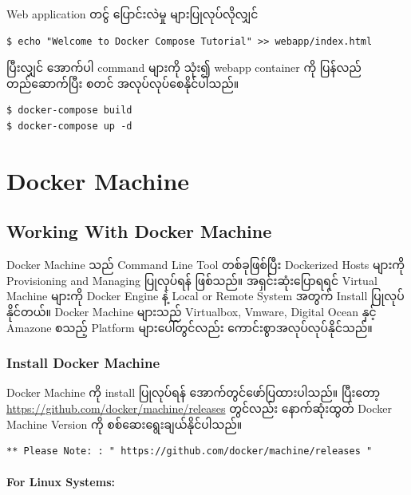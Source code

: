 \documentclass[]{article}
\let\oldparagraph\paragraph
\renewcommand{\paragraph}[1]{\oldparagraph{#1}\mbox{}}
\begin{document}
Web application တင်ွ ပြောင်းလဲမှု များပြုလုပ်လိုလျှင်

\begin{verbatim}
$ echo "Welcome to Docker Compose Tutorial" >> webapp/index.html
\end{verbatim}

ပြီးလျှင် အောက်ပါ command များကို သုံး၍ webapp container ကို ပြန်လည်
တည်ဆောက်ပြီး စတင် အလုပ်လုပ်စေနိုင်ပါသည်။

\begin{verbatim}
$ docker-compose build
$ docker-compose up -d
\end{verbatim}

\pagebreak

\hypertarget{docker-machine}{%
\section{Docker Machine}\label{docker-machine}}

\hypertarget{working-with-docker-machine}{%
\subsection{Working With Docker
Machine}\label{working-with-docker-machine}}

Docker Machine သည် Command Line Tool တစ်ခုဖြစ်ပြီး Dockerized Hosts
များကို Provisioning and Managing ပြုလုပ်ရန် ဖြစ်သည်။ အရှင်းဆုံးပြောရရင်
Virtual Machine များကို Docker Engine နဲ့ Local or Remote System အတွက်
Install ပြုလုပ်နိုင်တယ်။ Docker Machine များသည် Virtualbox, Vmware,
Digital Ocean နှင့် Amazone စသည့် Platform များပေါ်တွင်လည်း
ကောင်းစွာအလုပ်လုပ်နိုင်သည်။

\hypertarget{install-docker-machine}{%
\subsubsection{Install Docker Machine}\label{install-docker-machine}}

Docker Machine ကို install ပြုလုပ်ရန် အောက်တွင်ဖော်ပြထားပါသည်။ ပြီးတော့
\url{https://github.com/docker/machine/releases} တွင်လည်း နောက်ဆုံးထွတ်
Docker Machine Version ကို စစ်ဆေးရွေးချယ်နိုင်ပါသည်။

\begin{verbatim}
** Please Note: : " https://github.com/docker/machine/releases " 
\end{verbatim}

\hypertarget{for-linux-systems}{%
\paragraph{For Linux Systems:}\label{for-linux-systems}}
\end{document}
